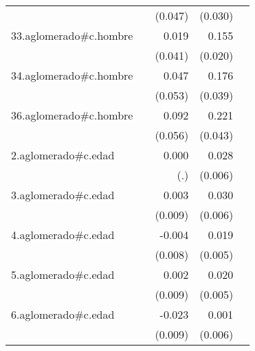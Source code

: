 {\begin{longtable}{l*{4}{D{.}{.}{-1}}}
            &                     &     (0.047)         &     (0.030)         &                     \\
\addlinespace
33.aglomerado#c.hombre&                     &       0.019         &       0.155\sym{***}&                     \\
            &                     &     (0.041)         &     (0.020)         &                     \\
\addlinespace
34.aglomerado#c.hombre&                     &       0.047         &       0.176\sym{***}&                     \\
            &                     &     (0.053)         &     (0.039)         &                     \\
\addlinespace
36.aglomerado#c.hombre&                     &       0.092         &       0.221\sym{***}&                     \\
            &                     &     (0.056)         &     (0.043)         &                     \\
\addlinespace
2.aglomerado#c.edad&                     &       0.000         &       0.028\sym{***}&                     \\
            &                     &         (.)         &     (0.006)         &                     \\
\addlinespace
3.aglomerado#c.edad&                     &       0.003         &       0.030\sym{***}&                     \\
            &                     &     (0.009)         &     (0.006)         &                     \\
\addlinespace
4.aglomerado#c.edad&                     &      -0.004         &       0.019\sym{***}&                     \\
            &                     &     (0.008)         &     (0.005)         &                     \\
\addlinespace
5.aglomerado#c.edad&                     &       0.002         &       0.020\sym{***}&                     \\
            &                     &     (0.009)         &     (0.005)         &                     \\
\addlinespace
6.aglomerado#c.edad&                     &      -0.023\sym{**} &       0.001         &                     \\
            &                     &     (0.009)         &     (0.006)         &                     \\

\end{longtable}}

